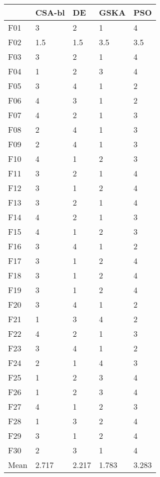 \begin{tabular}{lllll}
\toprule
{} & CSA-bl &     DE &   GSKA &    PSO \\
\midrule
F01  &      3 &      2 &      1 &      4 \\
F02  &    1.5 &    1.5 &    3.5 &    3.5 \\
F03  &      3 &      2 &      1 &      4 \\
F04  &      1 &      2 &      3 &      4 \\
F05  &      3 &      4 &      1 &      2 \\
F06  &      4 &      3 &      1 &      2 \\
F07  &      4 &      2 &      1 &      3 \\
F08  &      2 &      4 &      1 &      3 \\
F09  &      2 &      4 &      1 &      3 \\
F10  &      4 &      1 &      2 &      3 \\
F11  &      3 &      2 &      1 &      4 \\
F12  &      3 &      1 &      2 &      4 \\
F13  &      3 &      2 &      1 &      4 \\
F14  &      4 &      2 &      1 &      3 \\
F15  &      4 &      1 &      2 &      3 \\
F16  &      3 &      4 &      1 &      2 \\
F17  &      3 &      1 &      2 &      4 \\
F18  &      3 &      1 &      2 &      4 \\
F19  &      3 &      1 &      2 &      4 \\
F20  &      3 &      4 &      1 &      2 \\
F21  &      1 &      3 &      4 &      2 \\
F22  &      4 &      2 &      1 &      3 \\
F23  &      3 &      4 &      1 &      2 \\
F24  &      2 &      1 &      4 &      3 \\
F25  &      1 &      2 &      3 &      4 \\
F26  &      1 &      2 &      3 &      4 \\
F27  &      4 &      1 &      2 &      3 \\
F28  &      1 &      3 &      2 &      4 \\
F29  &      3 &      1 &      2 &      4 \\
F30  &      2 &      3 &      1 &      4 \\
Mean &  2.717 &  2.217 &  1.783 &  3.283 \\
\bottomrule
\end{tabular}
